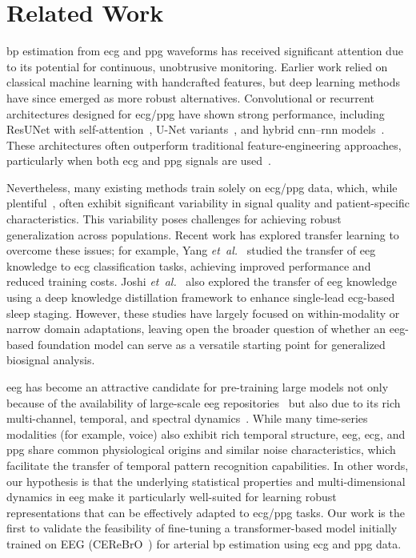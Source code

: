 \section{Related Work}\label{sec:related_works}
\gls{bp} estimation from \gls{ecg} and \gls{ppg} waveforms has received significant attention due to its potential for continuous, unobtrusive monitoring. Earlier work relied on classical machine learning with handcrafted features, but deep learning methods have since emerged as more robust alternatives. Convolutional or recurrent architectures designed for \gls{ecg}/\gls{ppg} have shown strong performance, including ResUNet with self-attention~\cite{Jamil}, U-Net variants~\cite{Mahmud_2022}, and hybrid \gls{cnn}--\gls{rnn} models~\cite{Paviglianiti2021ACO}. These architectures often outperform traditional feature-engineering approaches, particularly when both \gls{ecg} and \gls{ppg} signals are used~\cite{Paviglianiti2021ACO}.

Nevertheless, many existing methods train solely on \gls{ecg}/\gls{ppg} data, which, while plentiful~\cite{mimiciii,vitaldb,ptb-xl}, often exhibit significant variability in signal quality and patient-specific characteristics. This variability poses challenges for achieving robust generalization across populations. Recent work has explored transfer learning to overcome these issues; for example, Yang \emph{et~al.}~\cite{yang2023cross} studied the transfer of \gls{eeg} knowledge to \gls{ecg} classification tasks, achieving improved performance and reduced training costs. Joshi \emph{et~al.}~\cite{joshi2021deep} also explored the transfer of \gls{eeg} knowledge using a deep knowledge distillation framework to enhance single-lead \gls{ecg}-based sleep staging. However, these studies have largely focused on within-modality or narrow domain adaptations, leaving open the broader question of whether an \gls{eeg}-based foundation model can serve as a versatile starting point for generalized biosignal analysis.

\gls{eeg} has become an attractive candidate for pre-training large models not only because of the availability of large-scale \gls{eeg} repositories~\cite{TUEG} but also due to its rich multi-channel, temporal, and spectral dynamics~\cite{jiang2024large}. While many time-series modalities (for example, voice) also exhibit rich temporal structure, \gls{eeg}, \gls{ecg}, and \gls{ppg} share common physiological origins and similar noise characteristics, which facilitate the transfer of temporal pattern recognition capabilities. In other words, our hypothesis is that the underlying statistical properties and multi-dimensional dynamics in \gls{eeg} make it particularly well-suited for learning robust representations that can be effectively adapted to \gls{ecg}/\gls{ppg} tasks. Our work is the first to validate the feasibility of fine-tuning a transformer-based model initially trained on EEG (CEReBrO~\cite{CEReBrO}) for arterial \gls{bp} estimation using \gls{ecg} and \gls{ppg} data.

